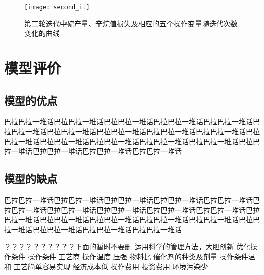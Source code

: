 \documentclass[bwprint]{gmcmthesis}
\begin{document}
\begin{figure}[htb]
	\centering
	\texttt{[image: second\_it]}
	\caption{第二轮迭代中硫产量、辛烷值损失及相应的五个操作变量随迭代次数变化的曲线}
\end{figure}


\FloatBarrier
\section{模型评价}


\FloatBarrier
\subsection{模型的优点}
巴拉巴拉一堆话巴拉巴拉一堆话巴拉巴拉一堆话巴拉巴拉一堆话巴拉巴拉一堆话巴拉巴拉一堆话巴拉巴拉一堆话巴拉巴拉一堆话巴拉巴拉一堆话巴拉巴拉一堆话巴拉巴拉一堆话巴拉巴拉一堆话巴拉巴拉一堆话巴拉巴拉一堆话巴拉巴拉一堆话巴拉巴拉一堆话巴拉巴拉一堆话巴拉巴拉一堆话巴拉巴拉一堆话


\FloatBarrier
\subsection{模型的缺点}
巴拉巴拉一堆话巴拉巴拉一堆话巴拉巴拉一堆话巴拉巴拉一堆话巴拉巴拉一堆话巴拉巴拉一堆话巴拉巴拉一堆话巴拉巴拉一堆话巴拉巴拉一堆话巴拉巴拉一堆话巴拉巴拉一堆话巴拉巴拉一堆话巴拉巴拉一堆话巴拉巴拉一堆话巴拉巴拉一堆话巴拉巴拉一堆话巴拉巴拉一堆话巴拉巴拉一堆话巴拉巴拉一堆话







？？？？？？？？？？下面的暂时不要删
运用科学的管理方法，大胆创新 优化操作条件 操作条件 工艺商
操作温度 压强 物料比 催化剂的种类及剂量 
操作条件温和 工艺简单容易实现 经济成本低 操作费用 投资费用 环境污染少 

\newpage

\end{document}
